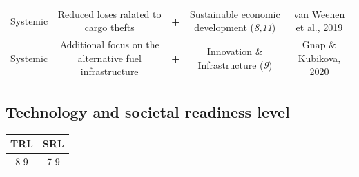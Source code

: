 \documentclass[
]{book}
\begin{document}
\begin{longtable}[]{@{}ccccc@{}}
\begin{minipage}[t]{0.17\columnwidth}\centering
Systemic\strut
\end{minipage} & \begin{minipage}[t]{0.16\columnwidth}\centering
Reduced loses ralated to cargo thefts\strut
\end{minipage} & \begin{minipage}[t]{0.17\columnwidth}\centering
\textbf{+}\strut
\end{minipage} & \begin{minipage}[t]{0.17\columnwidth}\centering
Sustainable economic development (\emph{8,11})\strut
\end{minipage} & \begin{minipage}[t]{0.17\columnwidth}\centering
van Weenen et al., 2019\strut
\end{minipage}\tabularnewline
\begin{minipage}[t]{0.17\columnwidth}\centering
Systemic\strut
\end{minipage} & \begin{minipage}[t]{0.16\columnwidth}\centering
Additional focus on the alternative fuel infrastructure\strut
\end{minipage} & \begin{minipage}[t]{0.17\columnwidth}\centering
\textbf{+}\strut
\end{minipage} & \begin{minipage}[t]{0.17\columnwidth}\centering
Innovation \& Infrastructure (\emph{9})\strut
\end{minipage} & \begin{minipage}[t]{0.17\columnwidth}\centering
Gnap \& Kubikova, 2020\strut
\end{minipage}\tabularnewline
\bottomrule
\end{longtable}

\hypertarget{technology-and-societal-readiness-level-31}{%
\subsection*{Technology and societal readiness level}\label{technology-and-societal-readiness-level-31}}

\begin{longtable}[]{@{}cc@{}}
\toprule
TRL & SRL\tabularnewline
\midrule
\endhead
8-9 & 7-9\tabularnewline
\bottomrule
\end{longtable}
\end{document}
